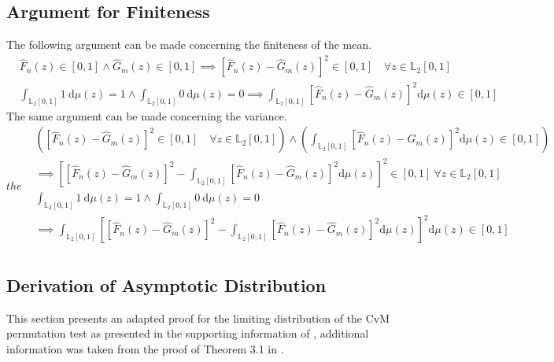 \documentclass[12pt, a4paper]{article}
\theoremstyle{MAstyle} \newtheorem{assumption}{Assumption}[section]
\theoremstyle{MAstyle} \newtheorem{definition}{Definition}[section]
\theoremstyle{MAstyle} \newtheorem{theorem}{Theorem}[section]
\begin{document}
		\subsection{Argument for Finiteness}\label{finiteness}
		The following argument can be made concerning the finiteness of the mean.
		\begin{equation}
			\begin{split}
				& \hat{F}_n(z) \in [0,1] 	\land \hat{G}_m(z) \in [0,1] \implies \left[\hat{F}_n(z) - \hat{G}_m(z)\right]^2 \in [0,1] \quad \forall z \in \mathbb{L}_2[0,1]\\
				& \int_{\mathbb{L}_2[0,1]} 1 \ \mathrm{d}\mu(z) = 1 \land \int_{\mathbb{L}_2[0,1]} 0 \ \mathrm{d}\mu(z) = 0 \implies \int_{\mathbb{L}_2[0,1]}\left[\hat{F}_n(z) - \hat{G}_m(z)\right]^2 \mathrm{d}\mu(z) \in [0,1]
			\end{split}
		\end{equation}			 
		The same argument can be made concerning the variance.
		\begin{equation}the 
			\begin{split}
				& \left(\left[\hat{F}_n(z) - \hat{G}_m(z)\right]^2 \in [0,1] \quad \forall z \in \mathbb{L}_2[0,1]\right) \land \left(\int_{\mathbb{L}_2[0,1]}\left[\hat{F}_n(z) - \hat{G}_m(z)\right]^2 \mathrm{d}\mu(z) \in [0,1] \right)\\
				& \implies \left[ \left[\hat{F}_n(z) - \hat{G}_m(z)\right]^2 - \int_{\mathbb{L}_2[0,1]}\left[\hat{F}_n(z) - \hat{G}_m(z)\right]^2 \mathrm{d}\mu(z) \right]^2 \in [0,1] \ \forall z \in \mathbb{L}_2[0,1]\\
				& \int_{\mathbb{L}_2[0,1]} 1 \ \mathrm{d}\mu(z) = 1 \land \int_{\mathbb{L}_2[0,1]} 0 \ \mathrm{d}\mu(z) = 0 \\
				& \implies \int_{\mathbb{L}_2[0,1]}\left[ \left[\hat{F}_n(z) - \hat{G}_m(z)\right]^2 - \int_{\mathbb{L}_2[0,1]}\left[\hat{F}_n(z) - \hat{G}_m(z)\right]^2 \mathrm{d}\mu(z) \right]^2 \mathrm{d}\mu(z) \in [0,1] \\
			\end{split}
		\end{equation}
	
		\subsection{Derivation of Asymptotic Distribution}\label{asymp_deriv}
			This section presents an adapted proof for the limiting distribution of the CvM permutation test as presented in the supporting information of \cite{bugni_permutation_2021}, additional information was taken from the proof of Theorem 3.1 in \cite{bugni_goodness--fit_2009}.\\
	
\end{document}
